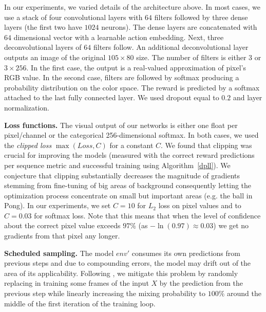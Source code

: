 In our experiments, we varied details of the architecture above. In most cases, we use a stack of four convolutional layers with $64$ filters followed by three dense layers (the first two have $1024$ neurons). The dense layers are concatenated with $64$ dimensional vector with a learnable action embedding. Next, three deconvolutional layers of $64$ filters follow. An additional deconvolutional layer outputs an image of the original $105\times 80$ size. The number of filters is either $3$ or $3 \times 256$. In the first case, the output is a real-valued approximation of pixel's RGB value. In the second case, filters are followed by softmax producing a probability distribution on the color space. The reward is predicted by a softmax attached to the last fully connected layer. 
We used dropout equal to $0.2$ and layer normalization. 


\textbf{Loss functions.}
The visual output of our networks is either one float per pixel/channel or the categorical 256-dimensional softmax. In both cases, we used the \textit{clipped loss} $\max(Loss, C)$ for a constant $C$. We found that clipping was crucial for improving the models (measured with the correct reward predictions per sequence metric and successful training using Algorithm~\ref{dpll}). We conjecture that clipping substantially decreases the magnitude of gradients stemming from fine-tuning of big areas of background consequently letting the optimization process concentrate on small but important areas (e.g. the ball in Pong). In our experiments, we set $C=10$ for $L_2$ loss on pixel values and to $C=0.03$ for softmax loss.
Note that this means that when the level of confidence about the correct pixel value exceeds $97\%$  (as $-\ln(0.97) \approx 0.03$) we get no gradients from that pixel any longer.

\textbf{Scheduled sampling.}
The model $env'$ consumes its own predictions from previous steps and due to compounding errors, the model may drift out of the area of its applicability. Following \cite{BengioVJS15,venkatraman}, we mitigate this problem by randomly replacing in training some frames of the input $X$ by the prediction from the previous step while linearly increasing the mixing probability to $100\%$ around the middle of the first iteration of the training loop.

